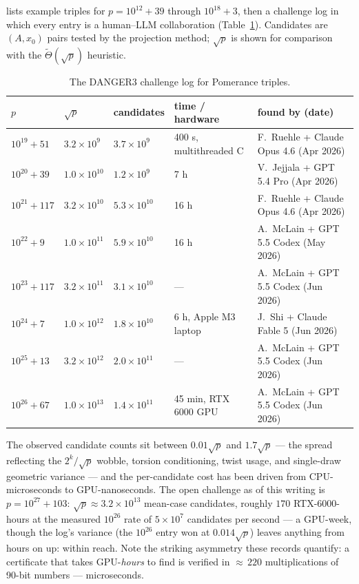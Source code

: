\documentclass[11pt]{amsart}
\newcommand{\Tt}{\widetilde{\Theta}}
\theoremstyle{plain}
\theoremstyle{definition}
\theoremstyle{remark}
\begin{document}
\cite{DANGER3} lists example triples for $p = 10^{12}+39$ through $10^{18}+3$, then a challenge log in
which every entry is a human--LLM collaboration (Table~\ref{tab:danger}).  Candidates are $(A, x_0)$
pairs tested by the projection method; $\sqrt p$ is shown for comparison with the $\Tt(\sqrt p)$
heuristic.

\begin{table}[htbp]
\centering\footnotesize
\begin{tabular}{@{}lllll@{}}
\toprule
$p$ & $\sqrt p$ & candidates & time / hardware & found by (date)\\
\midrule
$10^{19}+51$  & $3.2\times 10^{9}$  & $3.7\times 10^{9}$  & 400 s, multithreaded C & F.~Ruehle + Claude Opus 4.6 (Apr 2026)\\
$10^{20}+39$  & $1.0\times 10^{10}$ & $1.2\times 10^{9}$  & 7 h                    & V.~Jejjala + GPT 5.4 Pro (Apr 2026)\\
$10^{21}+117$ & $3.2\times 10^{10}$ & $5.3\times 10^{10}$ & 16 h                   & F.~Ruehle + Claude Opus 4.6 (Apr 2026)\\
$10^{22}+9$   & $1.0\times 10^{11}$ & $5.9\times 10^{10}$ & 16 h                   & A.~McLain + GPT 5.5 Codex (May 2026)\\
$10^{23}+117$ & $3.2\times 10^{11}$ & $3.1\times 10^{10}$ & ---                    & A.~McLain + GPT 5.5 Codex (Jun 2026)\\
$10^{24}+7$   & $1.0\times 10^{12}$ & $1.8\times 10^{10}$ & 6 h, Apple M3 laptop   & J.~Shi + Claude Fable 5 (Jun 2026)\\
$10^{25}+13$  & $3.2\times 10^{12}$ & $2.0\times 10^{11}$ & ---                    & A.~McLain + GPT 5.5 Codex (Jun 2026)\\
$10^{26}+67$  & $1.0\times 10^{13}$ & $1.4\times 10^{11}$ & 45 min, RTX 6000 GPU   & A.~McLain + GPT 5.5 Codex (Jun 2026)\\
\bottomrule
\end{tabular}
\medskip
\caption{The DANGER3 challenge log for Pomerance triples.}
\label{tab:danger}
\end{table}

The observed candidate counts sit between $0.01\sqrt p$ and $1.7\sqrt p$ --- the spread reflecting the
$2^k/\sqrt p$ wobble, torsion conditioning, twist usage, and single-draw geometric variance --- and the
per-candidate cost has been driven from CPU-microseconds to GPU-nanoseconds.  The open challenge as of
this writing is $p = 10^{27}+103$: $\sqrt p \approx 3.2\times 10^{13}$ mean-case candidates, roughly
$170$ RTX-6000-hours at the measured $10^{26}$ rate of $5\times 10^{7}$ candidates per second --- a
GPU-week, though the log's variance (the $10^{26}$ entry won at $0.014\sqrt p$) leaves anything from
hours on up: within reach.  Note the striking asymmetry these records
quantify: a certificate that takes GPU-\emph{hours} to find is verified in ${\approx}\,220$
multiplications of 90-bit numbers --- microseconds.
\end{document}
